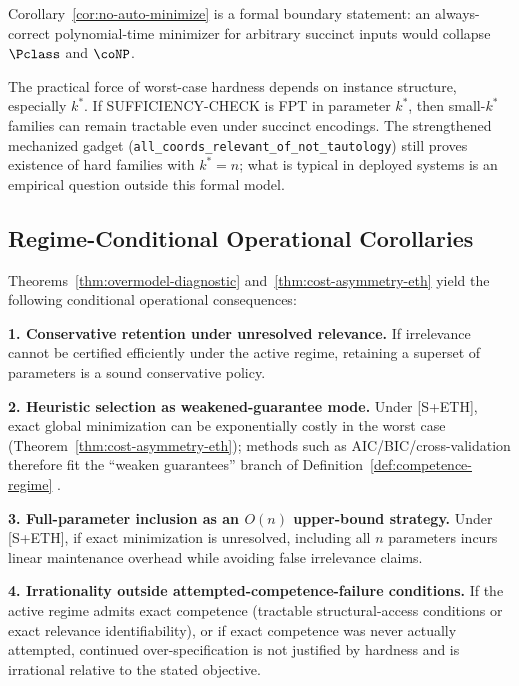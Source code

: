 \begin{remark}
Corollary~\ref{cor:no-auto-minimize} is a formal boundary statement: an always-correct polynomial-time minimizer for arbitrary succinct inputs would collapse \(\Pclass\) and \(\coNP\).
\end{remark}

\begin{remark}
The practical force of worst-case hardness depends on instance structure, especially $k^*$. If SUFFICIENCY-CHECK is FPT in parameter $k^*$, then small-$k^*$ families can remain tractable even under succinct encodings. The strengthened mechanized gadget (\texttt{all\_coords\_relevant\_of\_not\_tautology}) still proves existence of hard families with $k^*=n$; what is typical in deployed systems is an empirical question outside this formal model.
\end{remark}

\subsection{Regime-Conditional Operational Corollaries}

Theorems~\ref{thm:overmodel-diagnostic} and~\ref{thm:cost-asymmetry-eth} yield the following conditional operational consequences:

\textbf{1. Conservative retention under unresolved relevance.} If irrelevance cannot be certified efficiently under the active regime, retaining a superset of parameters is a sound conservative policy.

\textbf{2. Heuristic selection as weakened-guarantee mode.} Under [S+ETH], exact global minimization can be exponentially costly in the worst case (Theorem~\ref{thm:cost-asymmetry-eth}); methods such as AIC/BIC/cross-validation therefore fit the ``weaken guarantees'' branch of Definition~\ref{def:competence-regime} \cite{akaike1974new, schwarz1978estimating, stone1974cross, guyon2003introduction, pearl2009causality}.

\textbf{3. Full-parameter inclusion as an \(O(n)\) upper-bound strategy.} Under [S+ETH], if exact minimization is unresolved, including all \(n\) parameters incurs linear maintenance overhead while avoiding false irrelevance claims.

\textbf{4. Irrationality outside attempted-competence-failure conditions.} If the active regime admits exact competence (tractable structural-access conditions or exact relevance identifiability), or if exact competence was never actually attempted, continued over-specification is not justified by hardness and is irrational relative to the stated objective.

